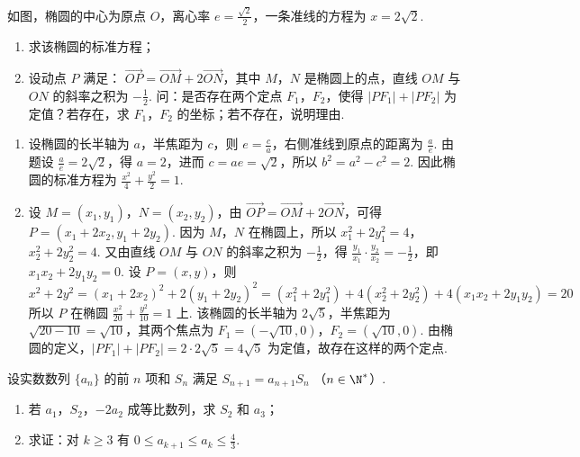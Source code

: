\begin{problem}
如图，椭圆的中心为原点 \(O\)，离心率 \(e = \frac{\sqrt{2}}{2}\)，一条准线的方程为 \(x = 2\sqrt{2}\).
\begin{enumerate}
\item 求该椭圆的标准方程；
\item 设动点 \(P\) 满足： \(\overrightarrow{OP} = \overrightarrow{OM} + 2\overrightarrow{ON}\)，其中 \(M\)，\(N\) 是椭圆上的点，直线 \(OM\) 与 \(ON\) 的斜率之积为 \(-\frac{1}{2}\). 问：是否存在两个定点 \(F_1\)，\(F_2\)，使得 \(|PF_1| + |PF_2|\) 为定值？若存在，求 \(F_1\)，\(F_2\) 的坐标；若不存在，说明理由.
\end{enumerate}

\end{problem}

\begin{solution}
\begin{enumerate}
\item 设椭圆的长半轴为 \(a\)，半焦距为 \(c\)，则 \(e=\frac{c}{a}\)，右侧准线到原点的距离为 \(\frac{a}{e}\). 由题设 \(\frac{a}{e}=2\sqrt{2}\)，得 \(a=2\)，进而 \(c=ae=\sqrt{2}\)，所以 \(b^2=a^2-c^2=2\). 因此椭圆的标准方程为 \(\frac{x^2}{4}+\frac{y^2}{2}=1\).
\item 设 \(M=(x_1,y_1)\)，\(N=(x_2,y_2)\)，由 \(\overrightarrow{OP}=\overrightarrow{OM}+2\overrightarrow{ON}\)，可得 \(P=(x_1+2x_2,y_1+2y_2)\). 因为 \(M\)，\(N\) 在椭圆上，所以 \(x_1^2+2y_1^2=4\)，\(x_2^2+2y_2^2=4\). 又由直线 \(OM\) 与 \(ON\) 的斜率之积为 \(-\frac{1}{2}\)，得 \(\frac{y_1}{x_1}\cdot\frac{y_2}{x_2}=-\frac{1}{2}\)，即 \(x_1x_2+2y_1y_2=0\). 设 \(P=(x,y)\)，则
\[
x^2+2y^2=(x_1+2x_2)^2+2(y_1+2y_2)^2=\left(x_1^2+2y_1^2\right)+4\left(x_2^2+2y_2^2\right)+4\left(x_1x_2+2y_1y_2\right)=20
\]
所以 \(P\) 在椭圆 \(\frac{x^2}{20}+\frac{y^2}{10}=1\) 上. 该椭圆的长半轴为 \(2\sqrt{5}\)，半焦距为 \(\sqrt{20-10}=\sqrt{10}\)，其两个焦点为 \(F_1=(-\sqrt{10},0)\)，\(F_2=(\sqrt{10},0)\). 由椭圆的定义，\(|PF_1|+|PF_2|=2\cdot2\sqrt{5}=4\sqrt{5}\) 为定值，故存在这样的两个定点.
\end{enumerate}
\end{solution}

\begin{problem}
设实数数列 \(\{a_{n}\}\) 的前 \(n\) 项和 \(S_{n}\) 满足 \(S_{n + 1} = a_{n + 1}S_n\) （\(n\in \N^*\)）.
\begin{enumerate}
\item 若 \(a_{1}\)，\(S_{2}\)，\(-2a_{2}\) 成等比数列，求 \(S_{2}\) 和 \(a_{3}\)；
\item 求证：对 \(k \geqslant 3\) 有 \(0 \leqslant a_{k+1} \leqslant a_k \leqslant \frac{4}{3}\).
\end{enumerate}
\end{problem}

